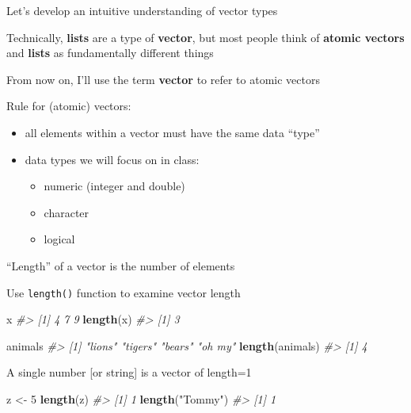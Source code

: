 \documentclass[10pt,ignorenonframetext,]{beamer}
\newenvironment{Shaded}{\begin{snugshade}}{\end{snugshade}}
\newcommand{\KeywordTok}[1]{\textcolor[rgb]{0.13,0.29,0.53}{\textbf{#1}}}
\newcommand{\DecValTok}[1]{\textcolor[rgb]{0.00,0.00,0.81}{#1}}
\newcommand{\StringTok}[1]{\textcolor[rgb]{0.31,0.60,0.02}{#1}}
\newcommand{\CommentTok}[1]{\textcolor[rgb]{0.56,0.35,0.01}{\textit{#1}}}
\newcommand{\NormalTok}[1]{#1}
\providecommand{\tightlist}{%
  \setlength{\itemsep}{0pt}\setlength{\parskip}{0pt}}
\begin{document}
\begin{frame}{Let's develop an intuitive understanding of vector types}

Technically, \textbf{lists} are a type of \textbf{vector}, but most
people think of \textbf{atomic vectors} and \textbf{lists} as
fundamentally different things

\medskip From now on, I'll use the term \textbf{vector} to refer to
atomic vectors

\medskip Rule for (atomic) vectors:

\begin{itemize}
\tightlist
\item
  all elements within a vector must have the same data ``type''
\item
  data types we will focus on in class:

  \begin{itemize}
  \tightlist
  \item
    numeric (integer and double)
  \item
    character
  \item
    logical
  \end{itemize}
\end{itemize}

\end{frame}

\begin{frame}[fragile]{``Length'' of a vector is the number of elements}

Use \texttt{length()} function to examine vector length

\begin{Shaded}
\begin{Highlighting}[]
\NormalTok{x}
\CommentTok{#> [1] 4 7 9}
\KeywordTok{length}\NormalTok{(x)}
\CommentTok{#> [1] 3}

\NormalTok{animals}
\CommentTok{#> [1] "lions"  "tigers" "bears"  "oh my"}
\KeywordTok{length}\NormalTok{(animals)}
\CommentTok{#> [1] 4}
\end{Highlighting}
\end{Shaded}

A single number {[}or string{]} is a vector of length=1

\begin{Shaded}
\begin{Highlighting}[]
\NormalTok{z <-}\StringTok{ }\DecValTok{5}
\KeywordTok{length}\NormalTok{(z)}
\CommentTok{#> [1] 1}
\KeywordTok{length}\NormalTok{(}\StringTok{"Tommy"}\NormalTok{)}
\CommentTok{#> [1] 1}
\end{Highlighting}
\end{Shaded}

\end{frame}
\end{document}
